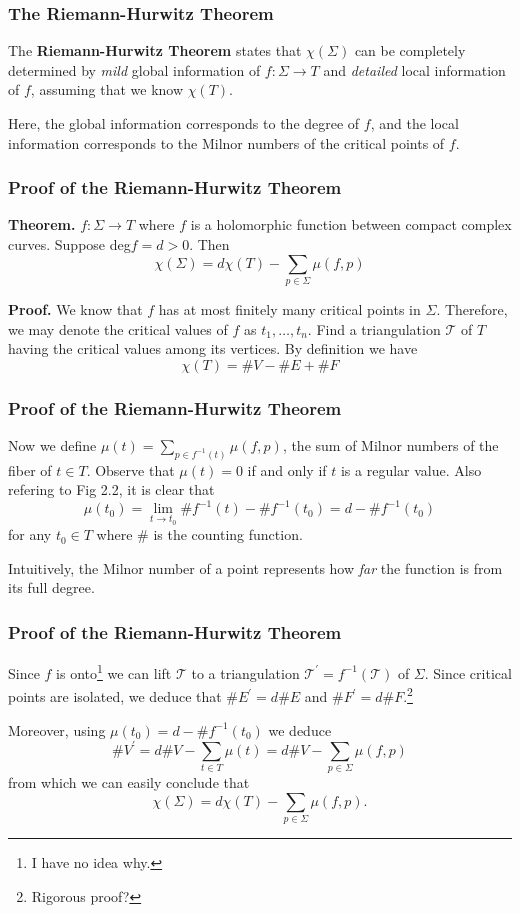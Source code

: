 \documentclass{beamer}
\begin{document}
\begin{frame}
\frametitle{The Riemann-Hurwitz Theorem}

The \textbf{Riemann-Hurwitz Theorem} states that $\chi(\Sigma)$ can be completely determined by \textit{mild} global information of $f : \Sigma \to T$ and \textit{detailed} local information of $f$, assuming that we know $\chi(T)$.

\phantom{?}

Here, the global information corresponds to the degree of $f$, and the local information corresponds to the Milnor numbers of the critical points of $f$.

\end{frame}


\begin{frame}
\frametitle{Proof of the Riemann-Hurwitz Theorem}

\textbf{Theorem.} $f:\Sigma \to T$ where $f$ is a holomorphic function between compact complex curves. Suppose deg$f = d > 0$. Then \[\chi(\Sigma) = d\chi(T) - \sum_{p \in \Sigma}\mu(f,p)\]

\textbf{Proof.} We know that $f$ has at most finitely many critical points in $\Sigma$. Therefore, we may denote the critical values of $f$ as $t_1, \ldots, t_n$. Find a triangulation $\mathcal{T}$ of $T$ having the critical values among its vertices. By definition we have \[\chi(T) = \#V-\#E+\#F\]


\end{frame}


\begin{frame}
\frametitle{Proof of the Riemann-Hurwitz Theorem}

Now we define $\mu(t) = \sum_{p \in f^{-1}(t)}\mu(f,p)$, the sum of Milnor numbers of the fiber of $t \in T$. Observe that $\mu(t) = 0$ if and only if $t$ is a regular value. Also refering to Fig 2.2, it is clear that \[\mu(t_0) = \lim_{t\to t_0}\#f^{-1}(t)-\#f^{-1}(t_0) = d - \#f^{-1}(t_0)\] for any $t_0 \in T$ where $\#$ is the counting function.

\phantom{?}

Intuitively, the Milnor number of a point represents how \textit{far} the function is from its full degree.

\end{frame}


\begin{frame}
\frametitle{Proof of the Riemann-Hurwitz Theorem}

Since $f$ is onto\footnote{I have no idea why.} we can lift $\mathcal{T}$ to a triangulation $\mathcal{T}^\prime = f^{-1}(\mathcal{T})$ of $\Sigma$. Since critical points are isolated, we deduce that $\#E^\prime = d\#E$ and $\#F^\prime = d\#F$.\footnote{Rigorous proof?}

\phantom{?}

Moreover, using $\mu(t_0) = d - \#f^{-1}(t_0)$ we deduce \[\#V^\prime = d\#V - \sum_{t\in T}\mu(t) = d\#V - \sum_{p\in \Sigma}\mu(f,p)\] from which we can easily conclude that \[\chi(\Sigma) = d\chi(T) - \sum_{p\in \Sigma}\mu(f,p).\]

\end{frame}
\end{document}
